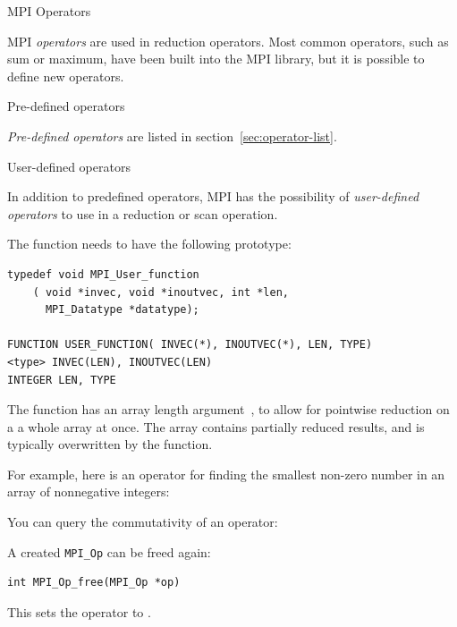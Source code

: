 
 {MPI Operators}

MPI \emph{operators} are used in reduction operators. Most common
operators, such as sum or maximum, have been built into the MPI
library, but it is possible to define new operators.

 {Pre-defined operators}

\emph{Pre-defined operators}
are listed in section~\ref{sec:operator-list}.

 {User-defined operators}

In addition to predefined operators, MPI has the possibility of
\emph{user-defined operators}
to use in a reduction or scan operation.


The function needs to have the following prototype:

\begin{verbatim}
typedef void MPI_User_function
    ( void *invec, void *inoutvec, int *len, 
      MPI_Datatype *datatype); 

FUNCTION USER_FUNCTION( INVEC(*), INOUTVEC(*), LEN, TYPE) 
<type> INVEC(LEN), INOUTVEC(LEN) 
INTEGER LEN, TYPE 
\end{verbatim}

The function has an array length argument~, to allow for
pointwise reduction on a a whole array at once. The  array
contains partially reduced results, and is typically overwritten by
the function.

For example, here is an operator for finding the smallest non-zero
number in an array of nonnegative integers:
%

You can query the commutativity of an operator:
%

A created \lstinline$MPI_Op$ can be freed again:
%
\begin{lstlisting}
int MPI_Op_free(MPI_Op *op)
\end{lstlisting}
%
This sets the operator to .

